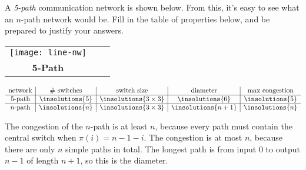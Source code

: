 
\begin{problem}
A \emph{5-path} communication network is shown below.  From this, it's
easy to see what an $n$-path network would be.  Fill in the table of
properties below, and be prepared to justify your answers.

\begin{center}
\begin{tabular}{ccc}
\texttt{[image: line-nw]}\\
\textbf{5-Path}%
\end{tabular}
\end{center}

{\large
\[
\begin{array}{c|c|c|c|c}
\text{network} &
\text{\# switches} &
\text{switch size} &
\text{diameter} &
\text{max congestion} \\ \hline
\text{5-path} &
\insolutions{5} &
\insolutions{3 \times 3} &
\insolutions{6} &
\insolutions{5} \\ \hline
\text{$n$-path} &
\insolutions{n} &
\insolutions{3 \times 3} &
\insolutions{n+1} &
\insolutions{n}
\end{array}
\]
}

\begin{solution}
The congestion of the $n$-path is at least $n$, because every
path must contain the central switch when $\pi(i) = n- 1 - i$.  The congestion
is at most $n$, because there are only $n$ simple paths in total.  The longest
path is from input 0 to output $n-1$ of length $n+1$, so this is the
diameter.
\end{solution}

\iffalse
The congestion of the 4-cycle is at least 3.  Consider the permutation
routing problem in which each input sends a packet to the diagonally
opposite output: $\pi(0) = 2$, $\pi(1) = 3$, $\pi(2) = 0$, $\pi(3) =
1$.  Packets 0 and 2 must pass through the switches on the upper left
and lower right in order to access the appropriate input and output
terminals.  Packets 1 must pass through one of these switches as well,
so at least three packets pass through either the upper-left switch or
the lower-left switch.

The congestion of the 4-cycle is at most 3.  Suppose we route each
packet by the shortest path and break ties by routing clockwise around
the cycle.  Now consider any particular switch, say the one in the
upper right.  At worst, this switch sees three packets: the one from
input 1, the one destined for output 1, and one passing through from
input 0 to output 2.  By symmetry, every switch sees at most 3 packets.}
\fi


\end{problem}
